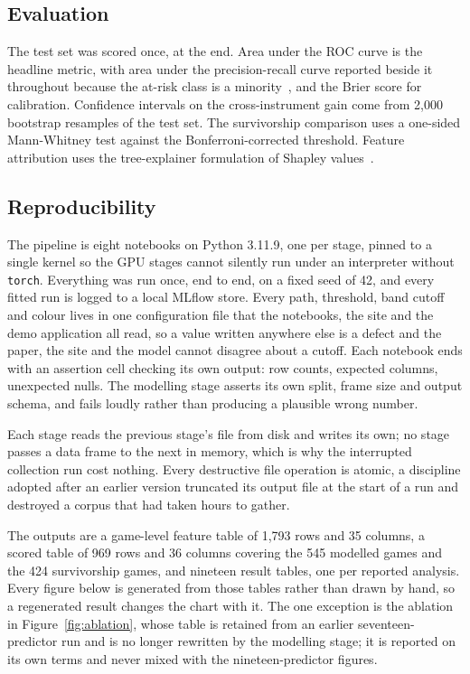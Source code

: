 \documentclass[sigconf]{acmart}
\begin{document}
\subsection{Evaluation}
\label{sec:methodEval}

The test set was scored once, at the end. Area under the ROC curve is the headline metric, with
area under the precision-recall curve reported beside it throughout because the at-risk class is a
minority~\cite{SaitoRehmsmeier2015}, and the Brier score for calibration. Confidence intervals on
the cross-instrument gain come from 2,000 bootstrap resamples of the test set. The survivorship
comparison uses a one-sided Mann-Whitney test against the Bonferroni-corrected threshold. Feature
attribution uses the tree-explainer formulation of Shapley values~\cite{Lundberg2020}.

\subsection{Reproducibility}
\label{sec:methodRepro}

The pipeline is eight notebooks on Python 3.11.9, one per stage, pinned to a single kernel so the
GPU stages cannot silently run under an interpreter without \texttt{torch}. Everything was run once,
end to end, on a fixed seed of 42, and every fitted run is logged to a local MLflow store. Every
path, threshold, band cutoff and colour lives in one configuration file that the notebooks, the
site and the demo application all read, so a value written anywhere else is a defect and the paper,
the site and the model cannot disagree about a cutoff. Each notebook ends with an assertion cell
checking its own output: row counts, expected columns, unexpected nulls. The modelling stage
asserts its own split, frame size and output schema, and fails loudly rather than producing a
plausible wrong number.

Each stage reads the previous stage's file from disk and writes its own; no stage passes a data
frame to the next in memory, which is why the interrupted collection run cost nothing. Every
destructive file operation is atomic, a discipline adopted after an earlier version truncated its
output file at the start of a run and destroyed a corpus that had taken hours to gather.

The outputs are a game-level feature table of 1,793 rows and 35 columns, a scored table of 969 rows
and 36 columns covering the 545 modelled games and the 424 survivorship games, and nineteen result
tables, one per reported analysis. Every figure below is generated from those tables rather than
drawn by hand, so a regenerated result changes the chart with it. The one exception is the ablation
in Figure~\ref{fig:ablation}, whose table is retained from an earlier seventeen-predictor run and
is no longer rewritten by the modelling stage; it is reported on its own terms and never mixed with
the nineteen-predictor figures.
\end{document}
